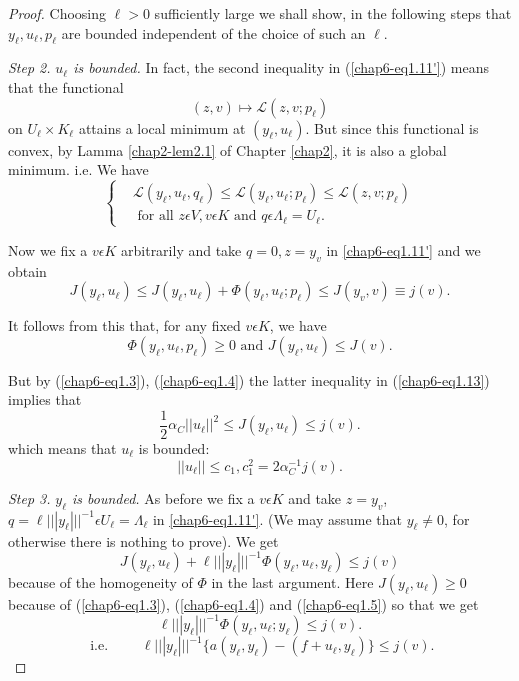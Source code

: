 \begin{proof}
Choosing $\ell > 0$ sufficiently large we shall show, in the following steps that $y_{\ell}, u_{\ell}, p_{\ell}$ are bounded independent of the choice of such an $\ell$.

{\em Step 2.} {\em $u_{\ell}$ is bounded.} In fact, the second
inequality in (\ref{chap6-eq1.11'}) means that the functional  
$$
(z, v) \mapsto \mathscr{L} (z, v ; p_{\ell})
$$ \pageoriginale
on $U_{\ell} \times K_{\ell}$ attains a local minimum at $(y_{\ell}, u_{\ell})$. But since this functional is convex, by Lamma \ref{chap2-lem2.1} of Chapter \ref{chap2}, it is also a global minimum. i.e. We have
\begin{equation*}
\begin{cases}
& \mathscr{L} (y_{\ell}, u_{\ell}, q_{\ell}) \leq \mathscr{L} (y_{\ell}, u_{\ell} ; p_{\ell}) \leq \mathscr{L} (z, v ; p_{\ell})\\
& \text{ for all } z \epsilon V, v \epsilon K \text{ and } q \epsilon \Lambda_{\ell} = U_{\ell}.\tag{1.12}\label{chap6-eq1.12}
\end{cases}
\end{equation*}

Now we fix a $v \epsilon K$ arbitrarily and take $q = 0, z = y_{v}$ in \ref{chap6-eq1.11'} and we obtain
$$
J(y_{\ell}, u_{\ell}) \leq J(y_{\ell}, u_{\ell}) + \Phi (y_{\ell},
u_{\ell} ; p_{\ell}) \leq J(y_{v}, v) \equiv j(v). 
$$

It follows from this that, for any fixed $v \epsilon K$, we have
\begin{equation*}
\Phi(y_{\ell}, u_{\ell}, p_{\ell}) \geq 0 \text{ and } J(y_{\ell},
u_{\ell}) \leq J(v).\tag{1.13}\label{chap6-eq1.13} 
\end{equation*}

But by (\ref{chap6-eq1.3}), (\ref{chap6-eq1.4}) the latter inequality in (\ref{chap6-eq1.13}) implies that 
$$
\frac{1}{2} \alpha_{C} ||u_{\ell}||^{2} \leq J(y_{\ell}, u_{\ell}) \leq j(v).
$$
which means that $u_{\ell}$ is bounded:
\begin{equation*}
||u_{\ell}|| \leq c_{1}, c_{1}^{2} = 2\alpha_{C}^{-1} j(v).\tag{1.14}\label{chap6-eq1.14}
\end{equation*}

{\em Step 3.} {\em $y_{\ell}$ is bounded.} As before we fix a $v \epsilon K$ and take $z = y_{v}$, $q = \ell |||y_{\ell}|||^{-1} \epsilon U_{\ell} = \Lambda_{\ell}$ in \ref{chap6-eq1.11'}. (We may assume that $y_{\ell} \neq 0$, for otherwise there is nothing to prove). We get
$$
J(y_{\ell}, u_{\ell}) + \ell|||y_{\ell}|||^{-1} \Phi(y_{\ell}, u_{\ell}, y_{\ell}) \leq j(v)
$$
because of the homogeneity of $\Phi$ in the last argument. Here $J(y_{\ell}, u_{\ell}) \geq 0$ because of (\ref{chap6-eq1.3}), (\ref{chap6-eq1.4}) and (\ref{chap6-eq1.5}) so that we get
$$
\ell |||y_{\ell}|||^{-1} \Phi (y_{\ell}, u_{\ell} ; y_{\ell}) \leq j(v).
$$
$$
\text{ i.e. }\qquad \ell|||y_{\ell}|||^{-1} \{a(y_{\ell}, y_{\ell}) - (f+ u_{\ell}, y_{\ell}) \} \leq j(v).
$$\pageoriginale


\end{proof}
